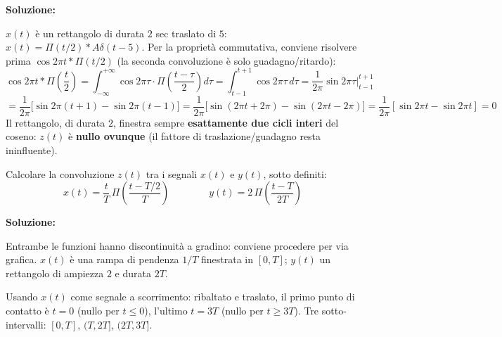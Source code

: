 \documentclass[12pt, a4paper]{article}
\begin{document}
\textbf{Soluzione:}

$x(t)$ è un rettangolo di durata $2$ sec traslato di $5$: $x(t)=\Pi(t/2)*A\delta(t-5)$. Per la proprietà commutativa, conviene risolvere prima $\cos2\pi t*\Pi(t/2)$ (la seconda convoluzione è solo guadagno/ritardo):
$$\cos2\pi t*\Pi\!\left(\frac t2\right) = \int_{-\infty}^{+\infty}\cos2\pi\tau\cdot\Pi\!\left(\frac{t-\tau}{2}\right)d\tau = \int_{t-1}^{t+1}\cos2\pi\tau\,d\tau = \frac{1}{2\pi}\sin2\pi\tau\Big|_{t-1}^{t+1}$$
$$=\frac1{2\pi}\big[\sin2\pi(t+1)-\sin2\pi(t-1)\big] = \frac1{2\pi}\big[\sin(2\pi t+2\pi)-\sin(2\pi t-2\pi)\big] = \frac1{2\pi}[\sin2\pi t-\sin2\pi t]=0$$
Il rettangolo, di durata $2$, finestra sempre \textbf{esattamente due cicli interi} del coseno: $z(t)$ è \textbf{nullo ovunque} (il fattore di traslazione/guadagno resta ininfluente).

\bigskip

\begin{tcolorbox}[colback=lightergray!10, colframe=tocsec, title=\textbf{Esercizio 4}]
Calcolare la convoluzione $z(t)$ tra i segnali $x(t)$ e $y(t)$, sotto definiti:
$$x(t) = \frac tT\,\Pi\!\left(\frac{t-T/2}{T}\right) \qquad\qquad y(t) = 2\,\Pi\!\left(\frac{t-T}{2T}\right)$$
\end{tcolorbox}

\textbf{Soluzione:}

Entrambe le funzioni hanno discontinuità a gradino: conviene procedere per via grafica. $x(t)$ è una rampa di pendenza $1/T$ finestrata in $[0,T]$; $y(t)$ un rettangolo di ampiezza $2$ e durata $2T$.

\begin{center}
\end{center}

Usando $x(t)$ come segnale a scorrimento: ribaltato e traslato, il primo punto di contatto è $t=0$ (nullo per $t\le0$), l'ultimo $t=3T$ (nullo per $t\ge3T$). Tre sotto-intervalli: $[0,T]$, $(T,2T]$, $(2T,3T]$.
\end{document}
